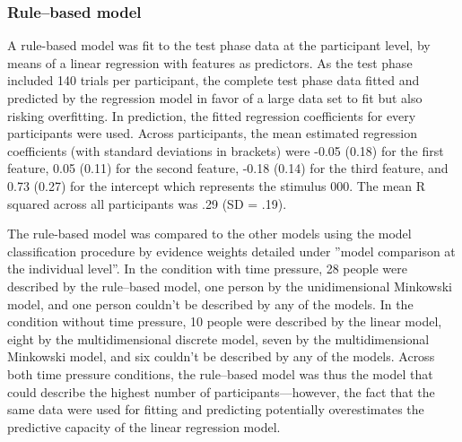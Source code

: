 \documentclass[a4paper,man,natbib]{apa6}
\begin{document}
\subsubsection{Rule--based model}
A rule-based model was fit to the test phase data at the participant level, by means of a linear regression with features as predictors. As the test phase included 140 trials per participant, the complete test phase data fitted and predicted by the regression model in favor of a large data set to fit but also risking overfitting. In prediction, the fitted regression coefficients for every participants were used. Across participants, the mean estimated regression coefficients (with standard deviations in brackets) were -0.05 (0.18) for the first feature, 0.05 (0.11) for the second feature, -0.18 (0.14) for the third feature, and 0.73 (0.27) for the intercept which represents the stimulus 000. The mean R squared across all participants was .29 (SD = .19).

The rule-based model was compared to the other models using the model classification procedure by evidence weights detailed under ''model comparison at the individual level''. In the condition with time pressure, 28 people were described by the rule--based model, one person by the unidimensional Minkowski model, and one person couldn't be described by any of the models. In the condition without time pressure, 10 people were described by the linear model, eight by the multidimensional discrete model, seven by the multidimensional Minkowski model, and six couldn't be described by any of the models. Across both time pressure conditions, the rule--based model was thus the model that could describe the highest number of participants---however, the fact that the same data were used for fitting and predicting potentially overestimates the predictive capacity of the linear regression model. 
\end{document}
